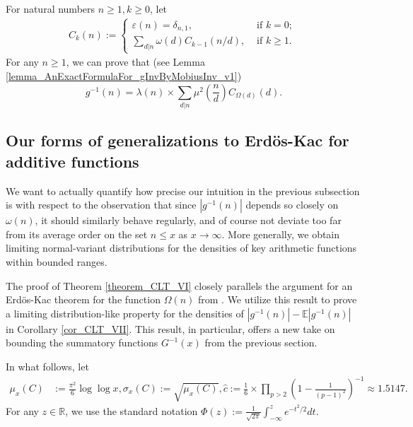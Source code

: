 \documentclass[11pt,reqno,a4letter]{article}
\numberwithin{figure}{section}
\numberwithin{table}{section}
\theoremstyle{plain}
\numberwithin{theorem}{section}
\theoremstyle{definition}
\begin{document}
For natural numbers $n \geq 1, k \geq 0$, let 
\begin{align*} 
C_k(n) := \begin{cases} 
     \varepsilon(n) = \delta_{n,1}, & \text{ if $k = 0$; } \\ 
     \sum\limits_{d|n} \omega(d) C_{k-1}(n/d), & \text{ if $k \geq 1$. } 
     \end{cases} 
\end{align*} 
For any $n \geq 1$, we can prove that (see Lemma \ref{lemma_AnExactFormulaFor_gInvByMobiusInv_v1})
\begin{equation} 
\label{eqn_AnExactFormulaFor_gInvByMobiusInv_v2} 
g^{-1}(n) = \lambda(n) \times \sum_{d|n} \mu^2\left(\frac{n}{d}\right) C_{\Omega(d)}(d). 
\end{equation} 

\subsection{Our forms of generalizations to Erd\"os-Kac for additive functions} 

We want to actually quantify how precise our intuition in the previous subsection is with respect to 
the observation that since $|g^{-1}(n)|$ depends so closely on $\omega(n)$, it should similarly behave 
regularly, and of course not deviate too far from its average order on the set $n \leq x$ as 
$x \rightarrow \infty$. More generally, we obtain limiting normal-variant distributions for the 
densities of key arithmetic functions within bounded ranges. 

The proof of Theorem \ref{theorem_CLT_VI} closely parallels the argument for an Erd\"os-Kac 
theorem for the function $\Omega(n)$ from \cite[\S 7.4]{MV}. 
We utilize this result to prove a limiting distribution-like property for the densities of 
$|g^{-1}(n)| - \mathbb{E}|g^{-1}(n)|$ in 
Corollary \ref{cor_CLT_VII}. 
This result, in particular, offers a new take on bounding the 
summatory functions $G^{-1}(x)$ from the previous section. 

In what follows, let 
\begin{align*} 
\mu_x(C) & := \frac{\pi^2}{6} \log\log x, 
\sigma_x(C) := \sqrt{\mu_x(C)}, 
\widehat{c} := \frac{1}{6} \times \prod_{p > 2} \left(1 - \frac{1}{(p-1)^2}\right)^{-1} 
      \approx 1.5147. 
\end{align*} 
For any $z \in \mathbb{R}$, we use the standard 
notation $\Phi(z) := \frac{1}{\sqrt{2\pi}} \int_{-\infty}^{z} e^{-t^2/2} dt$. 
\end{document}
